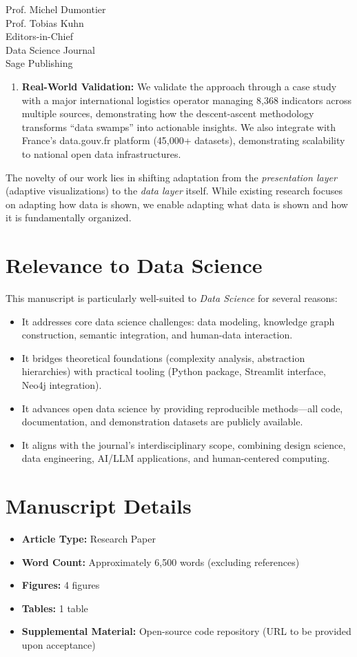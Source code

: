\documentclass[11pt,a4paper]{letter}
\begin{document}
\begin{letter}{%
Prof. Michel Dumontier\\
Prof. Tobias Kuhn\\
Editors-in-Chief\\
Data Science Journal\\
Sage Publishing
}
\begin{enumerate}
    \item \textbf{Real-World Validation:} We validate the approach through a case study with a major international logistics operator managing 8,368 indicators across multiple sources, demonstrating how the descent-ascent methodology transforms ``data swamps'' into actionable insights. We also integrate with France's data.gouv.fr platform (45,000+ datasets), demonstrating scalability to national open data infrastructures.
\end{enumerate}

The novelty of our work lies in shifting adaptation from the \textit{presentation layer} (adaptive visualizations) to the \textit{data layer} itself. While existing research focuses on adapting how data is shown, we enable adapting what data is shown and how it is fundamentally organized.

\section*{Relevance to Data Science}

This manuscript is particularly well-suited to \textit{Data Science} for several reasons:

\begin{itemize}
    \item It addresses core data science challenges: data modeling, knowledge graph construction, semantic integration, and human-data interaction.

    \item It bridges theoretical foundations (complexity analysis, abstraction hierarchies) with practical tooling (Python package, Streamlit interface, Neo4j integration).

    \item It advances open data science by providing reproducible methods---all code, documentation, and demonstration datasets are publicly available.

    \item It aligns with the journal's interdisciplinary scope, combining design science, data engineering, AI/LLM applications, and human-centered computing.
\end{itemize}

\section*{Manuscript Details}

\begin{itemize}
    \item \textbf{Article Type:} Research Paper
    \item \textbf{Word Count:} Approximately 6,500 words (excluding references)
    \item \textbf{Figures:} 4 figures
    \item \textbf{Tables:} 1 table
    \item \textbf{Supplemental Material:} Open-source code repository (URL to be provided upon acceptance)
\end{itemize}


\end{letter}
\end{document}

